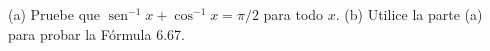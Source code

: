 \item (a) Pruebe que $\operatorname{sen}^{-1} x + \cos^{-1} x = \pi/2$ para todo $x$. (b) Utilice la parte (a) para probar la Fórmula 6.67.
